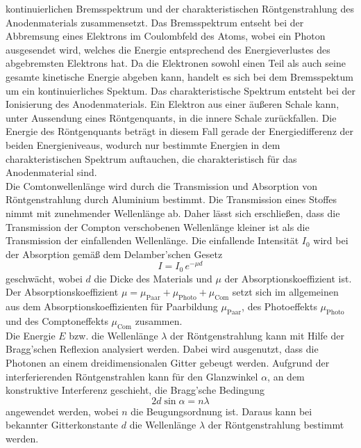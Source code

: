 kontinuierlichen Bremsspektrum und der charakteristischen Röntgenstrahlung des Anodenmaterials zusammensetzt. Das Bremsspektrum entseht bei der Abbremsung eines Elektrons im Coulombfeld des Atoms, wobei ein 
Photon ausgesendet wird, welches die Energie entsprechend des Energieverlustes des abgebremsten Elektrons hat. Da die Elektronen sowohl einen Teil als auch seine gesamte kinetische Energie abgeben kann, handelt es sich bei dem Bremsspektum um ein kontinuierliches Spektum.
Das charakteristische Spektrum entsteht bei der Ionisierung des Anodenmaterials. Ein Elektron aus einer äußeren Schale kann, unter Aussendung eines Röntgenquants, in die innere Schale zurückfallen. Die Energie des Röntgenquants beträgt in diesem Fall gerade der Energiedifferenz der beiden Energieniveaus, wodurch nur bestimmte Energien
in dem charakteristischen Spektrum auftauchen, die charakteristisch für das Anodenmaterial sind.
\\
Die Comtonwellenlänge wird durch die Transmission und Absorption von Röntgenstrahlung durch Aluminium bestimmt. Die Transmission eines Stoffes nimmt mit zunehmender Wellenlänge ab.
Daher lässt sich erschließen, dass die Transmission der Compton verschobenen Wellenlänge kleiner ist als die Transmission der einfallenden Wellenlänge. Die
einfallende Intensität $I_0$ wird bei der Absorption gemäß dem Delamber'schen Gesetz
\begin{equation}
    I=I_0 \, e^{-\mu d}
    \label{eqn:delam}
\end{equation}
geschwächt, wobei $d$ die Dicke des Materials und $\mu$ der Absorptionskoeffizient ist. Der Absorptionskoeffizient $\mu=\mu_\text{Paar}+\mu_\text{Photo}+\mu_\text{Com}$ setzt sich im allgemeinen
aus dem Absorptionskoeffizienten für Paarbildung $\mu_\text{Paar}$, des Photoeffekts $\mu_\text{Photo}$ und des Comptoneffekts $\mu_\text{Com}$ zusammen.
\\
Die Energie $E$ bzw. die Wellenlänge $\lambda$ der Röntgenstrahlung kann mit Hilfe der Bragg'schen Reflexion analysiert werden. Dabei wird ausgenutzt, dass die Photonen an einem dreidimensionalen Gitter gebeugt werden.
Aufgrund der interferierenden Röntgenstrahlen kann für den Glanzwinkel $\alpha$, an dem konstruktive Interferenz geschieht, die Bragg'sche Bedingung
\begin{equation}
    2 d \sin \alpha = n \lambda
    \label{eqn:bragg}
\end{equation}
angewendet werden, wobei $n$ die Beugungsordnung ist. Daraus kann bei bekannter Gitterkonstante $d$ die Wellenlänge $\lambda$ der Röntgenstrahlung bestimmt werden. 